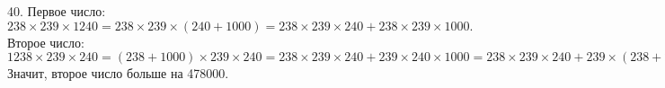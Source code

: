 40. Первое число: $238\times239\times1240=238\times239\times(240+1000)=238\times239\times240+238\times239\times1000.$ Второе число: $1238\times239\times240=(238+1000)\times239\times240=238\times239\times240+239\times240\times1000=238\times239\times240+239\times(238+2)\times1000=
238\times239\times240+239\times238\times1000+239\times2\times1000=238\times239\times240+239\times238\times1000+478000.$ Значит, второе число больше на 478000.\\
